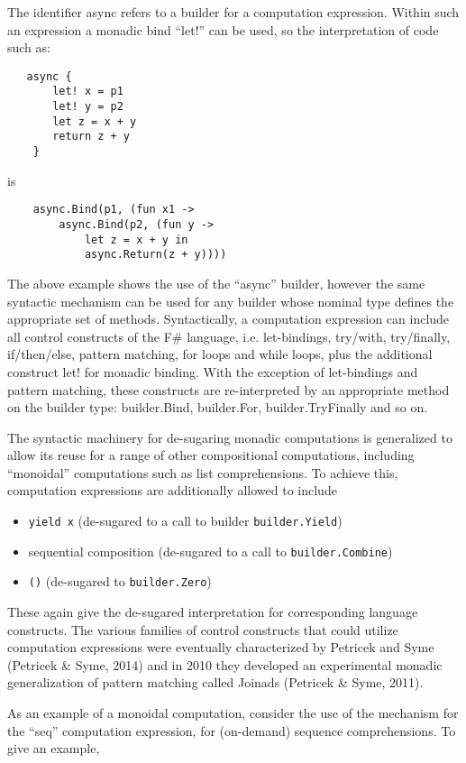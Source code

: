 \documentclass[acmsmall,review]{acmart}\settopmatter{printfolios=true,printccs=false,printacmref=false}
\begin{document}
The identifier async refers to a builder for a computation expression. Within such an expression a monadic bind “let!” can be used, so the interpretation of code such as:
\begin{verbatim}
   async { 
       let! x = p1 
       let! y = p2
       let z = x + y
       return z + y 
    }
\end{verbatim}
is
\begin{verbatim}
    async.Bind(p1, (fun x1 -> 
        async.Bind(p2, (fun y -> 
            let z = x + y in
            async.Return(z + y))))
\end{verbatim}
The above example shows the use of the “async” builder, however the same syntactic mechanism can be used for any builder whose nominal type defines the appropriate set of methods.  Syntactically, a computation expression can include all control constructs of the F\# language, i.e. let-bindings, try/with, try/finally, if/then/else, pattern matching, for loops and while loops, plus the additional construct let! for monadic binding. With the exception of let-bindings and pattern matching, these constructs are re-interpreted by an appropriate method on the builder type: builder.Bind, builder.For, builder.TryFinally and so on.  


The syntactic machinery for de-sugaring monadic computations is generalized to allow its reuse for a range of other compositional computations, including “monoidal” computations such as list comprehensions. To achieve this, computation expressions are additionally allowed to include 

\begin{itemize}
\item \texttt{yield x} (de-sugared to a call to builder \texttt{builder.Yield})
\item sequential composition (de-sugared to a call to \texttt{builder.Combine}) 
\item \texttt{()} (de-sugared to \texttt{builder.Zero}) 
\end{itemize}
These again give the de-sugared interpretation for corresponding language constructs.  The various families of control constructs that could utilize computation expressions were eventually characterized by Petricek and Syme (Petricek \& Syme, 2014) and in 2010 they developed an experimental monadic generalization of pattern matching called Joinads (Petricek \& Syme, 2011).

As an example of a monoidal computation, consider the use of the mechanism for the “seq” computation expression, for (on-demand) sequence comprehensions.  To give an example, 
\end{document}
